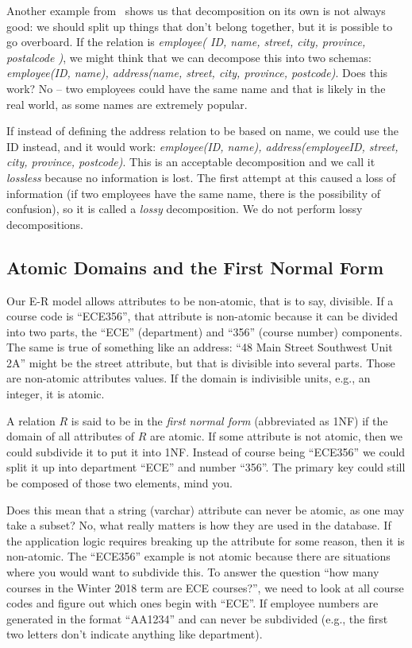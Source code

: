 Another example from~\cite{dsc} shows us that decomposition on its own is not always good: we should split up things that don't belong together, but it is possible to go overboard. If the relation is \textit{employee( ID, name, street, city, province, postalcode )}, we might think that we can decompose this into two schemas: \textit{employee(ID, name), address(name, street, city, province, postcode)}. Does this work? No -- two employees could have the same name and that is likely in the real world, as some names are extremely popular. 

If instead of defining the address relation to be based on name, we could use the ID instead, and it would work: \textit{employee(ID, name), address(employeeID, street, city, province, postcode)}. This is an acceptable decomposition and we call it \textit{lossless} because no information is lost. The first attempt at this caused a loss of information (if two employees have the same name, there is the possibility of confusion), so it is called a \textit{lossy} decomposition. We do not perform lossy decompositions.

\subsection*{Atomic Domains and the First Normal Form}

Our E-R model allows attributes to be non-atomic, that is to say, divisible. If a course code is ``ECE356'', that attribute is non-atomic because it can be divided into two parts, the ``ECE'' (department) and ``356'' (course number) components. The same is true of something like an address: ``48 Main Street Southwest Unit 2A'' might be the street attribute, but that is divisible into several parts. Those are non-atomic attributes values. If the domain is indivisible units, e.g., an integer, it is atomic.

A relation $R$ is said to be in the \textit{first normal form} (abbreviated as 1NF) if the domain of all attributes of $R$ are atomic. If some attribute is not atomic, then we could subdivide it to put it into 1NF. Instead of course being ``ECE356'' we could split  it up into department ``ECE'' and number ``356''. The primary key could still be composed of those two elements, mind you.

Does this mean that a string (varchar) attribute can never be atomic, as one may take a subset? No, what really matters is how they are used in the database. If the application logic requires breaking up the attribute for some reason, then it is non-atomic. The ``ECE356'' example is not atomic because there are situations where you would want to subdivide this. To answer the question ``how many courses in the Winter 2018 term are ECE courses?'', we need to look at all course codes and figure out which ones begin with ``ECE''. If employee numbers are generated in the format ``AA1234'' and can never be subdivided (e.g., the first two letters don't indicate anything like department). 

